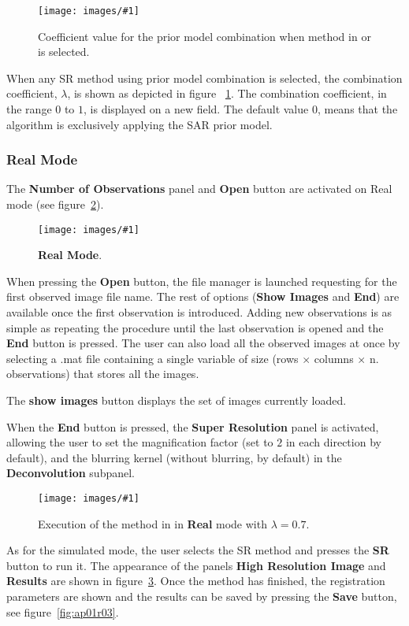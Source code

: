 \documentclass[11pt,a4paper]{article}
\newcommand{\figureimage}[4]{%
\begin{figure}[t]%
\begin{center}%
\texttt{[image: images/\#1]}%
\caption{#4}%
\label{#3}%
\end{center}%
\end{figure}%
} %
\newcommand{\new}[1]{#1} %
\begin{document}
\figureimage{s12}{width=0.75\textwidth}{fig:ap01s12}%
 {Coefficient value for the prior model combination when method in \cite{Villena:11} or \cite{VillenaIcip:10} is selected.}
  
When any SR method using prior model combination  is selected, the combination coefficient, $\lambda$, is shown  as depicted in figure ~\ref{fig:ap01s12}. The combination coefficient, in the range $0$ to $1$, is displayed on a new field. The default value $0$, means that the algorithm is exclusively applying the SAR prior model.

\subsubsection{Real Mode}

The \textbf{Number of Observations} panel and \textbf{Open} button are activated on Real mode (see figure~\ref{fig:ap01r01}).

\figureimage{r01}{width=0.75\textwidth}{fig:ap01r01}%
 {\textbf{Real Mode}.}
 
When pressing the \textbf{Open} button, the file manager is launched requesting for the first observed image file name. The rest of options (\textbf{Show Images} and \textbf{End}) are available once the first observation is introduced. Adding new observations is as simple as repeating the procedure until the last observation is opened and the \textbf{End}  button is pressed.
 \new{The user can also load all the observed images at once by selecting a .mat file containing a single variable of size (rows $\times$ columns $\times$ n. observations) that stores all the images. }

 
The \textbf{show images} button displays the set of images currently loaded.
 
When the \textbf{End} button is pressed, the \textbf{Super Resolution} panel is activated, allowing the user to set the magnification factor (set to $2$ in each direction by default), and the blurring kernel (without blurring, by default) in the \textbf{Deconvolution} subpanel.

\figureimage{r02}{width=0.75\textwidth}{fig:ap01r02}%
 {Execution of the method in \cite{Villena:11}  in \textbf{Real} mode with $\lambda=0.7$.}
 
As for the simulated mode, the user selects the SR method and presses the \textbf{SR} button to run it. The appearance of the panels \textbf{High Resolution Image} and \textbf{Results} are shown in figure~\ref{fig:ap01r02}. Once the method has finished, the registration parameters are shown and the results can be saved by pressing the \textbf{Save} button, see figure~\ref{fig:ap01r03}.
 
\end{document}
